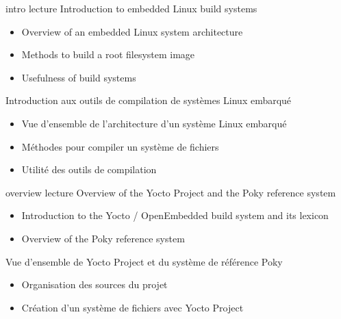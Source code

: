 
\def \onsitelecturetimeratio{40}
\def \onsitelabtimeratio{60}


{intro}
{lecture}
{Introduction to embedded Linux build systems}
{
  \begin{itemize}
  \item Overview of an embedded Linux system architecture
  \item Methods to build a root filesystem image
  \item Usefulness of build systems
  \end{itemize}
}
{Introduction aux outils de compilation de systèmes Linux embarqué}
{
  \begin{itemize}
  \item Vue d'ensemble de l'architecture d'un système Linux embarqué
  \item Méthodes pour compiler un système de fichiers
  \item Utilité des outils de compilation
  \end{itemize}
}

{overview}
{lecture}
{Overview of the Yocto Project and the Poky reference system}
{
  \begin{itemize}
  \item Introduction to the Yocto / OpenEmbedded build system and its lexicon
  \item Overview of the Poky reference system
  \end{itemize}
}
{Vue d'ensemble de Yocto Project et du système de référence Poky}
{
  \begin{itemize}
  \item Organisation des sources du projet
  \item Création d'un système de fichiers avec Yocto Project
  \end{itemize}
}

